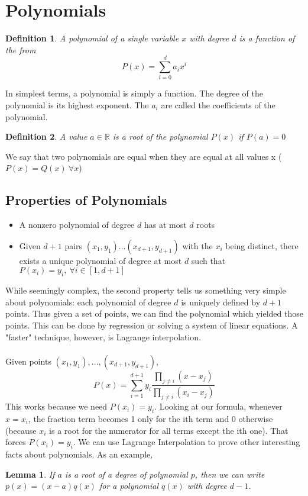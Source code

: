 \documentclass{article}
\newtheorem{definition}{Definition}
\newtheorem{lemma}{Lemma}
\begin{document}
\section{Polynomials}
\begin{definition}
    A polynomial of a single variable $x$ with degree $d$ is a function of the from
    $$P(x) = \sum_{i=0}^{d}{a_ix^i}$$
\end{definition}
In simplest terms, a polynomial is simply a function. The degree of the polynomial is its highest exponent. The $a_i$ are called the coefficients of the polynomial.
\begin{definition}
    A value $a \in \mathbb{R}$ is a root of the polynomial $P(x)$ if $P(a)=0$
\end{definition}
We say that two polynomials are equal when they are equal at all values x ($P(x) = Q(x)\ \forall x$)
\subsection{Properties of Polynomials}
\begin{itemize}
    \item[1.] A nonzero polynomial of degree $d$ has at most $d$ roots
    \item[2.] Given $d+1$ pairs $(x_1, y_1)...(x_{d+1}, y_{d+1})$ with the $x_i$ being distinct, there exists a unique polynomial of degree at most $d$ such that $P(x_i)=y_i, \ \forall i\in[1, d+1]$
\end{itemize}
While seemingly complex, the second property tells us something very simple about polynomials: each polynomial of degree $d$ is uniquely defined by $d+1$ points.
Thus given a set of points, we can find the polynomial which yielded those points. This can be done by regression or solving a system of linear equations.
A "faster" technique, however, is Lagrange interpolation.\\\\
Given points $(x_1, y_1),...,(x_{d+1}, y_{d+1})$,
$$P(x) = \sum_{i=1}^{d+1}{y_i\frac{\prod_{j\ne i}(x-x_j)}{\prod_{j\ne i}{(x_i-x_j)}}}$$
This works because we need $P(x_i)=y_i$. Looking at our formula, whenever $x = x_i$, the fraction term becomes 1 only for the ith term
and 0 otherwise (because $x_i$ is a root for the numerator for all terms except the ith one). That forces $P(x_i)=y_i$.
We can use Lagrange Interpolation to prove other interesting facts about polynomials. As an example,
\begin{lemma}
    If $a$ is a root of a degree of polynomial $p$, then we can write $p(x)=(x-a)q(x)$
    for a polynomial $q(x)$ with degree $d-1$.
\end{lemma}
\end{document}
